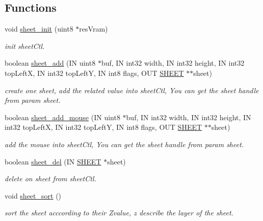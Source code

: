 \subsection*{Functions}
\begin{DoxyCompactItemize}
\item 
void \hyperlink{group__sheet_ga84bc4feeaed8d9ee63caa9ac081b4d90}{sheet\+\_\+init} (uint8 $\ast$res\+Vram)
\begin{DoxyCompactList}\small\item\em init sheet\+Ctl. \end{DoxyCompactList}\item 
boolean \hyperlink{group__sheet_ga91b935bbd00dee76f18e37307dbf116b}{sheet\+\_\+add} (I\+N uint8 $\ast$buf, I\+N int32 width, I\+N int32 height, I\+N int32 top\+Left\+X, I\+N int32 top\+Left\+Y, I\+N int8 flags, O\+U\+T \hyperlink{struct_s_h_e_e_t}{S\+H\+E\+E\+T} $\ast$$\ast$sheet)
\begin{DoxyCompactList}\small\item\em create one sheet, add the related value into sheet\+Ctl, You can get the sheet handle from param sheet. \end{DoxyCompactList}\item 
boolean \hyperlink{group__sheet_ga945f67fabfd3cdf76d1403692b6749eb}{sheet\+\_\+add\+\_\+mouse} (I\+N uint8 $\ast$buf, I\+N int32 width, I\+N int32 height, I\+N int32 top\+Left\+X, I\+N int32 top\+Left\+Y, I\+N int8 flags, O\+U\+T \hyperlink{struct_s_h_e_e_t}{S\+H\+E\+E\+T} $\ast$$\ast$sheet)
\begin{DoxyCompactList}\small\item\em add the mouse into sheet\+Ctl, You can get the sheet handle from param sheet. \end{DoxyCompactList}\item 
boolean \hyperlink{group__sheet_gac54d19422d9a8fc6ee0ac68b18d23664}{sheet\+\_\+del} (I\+N \hyperlink{struct_s_h_e_e_t}{S\+H\+E\+E\+T} $\ast$sheet)
\begin{DoxyCompactList}\small\item\em delete on sheet from sheet\+Ctl. \end{DoxyCompactList}\item 
void \hyperlink{group__sheet_gaac62e7c10483a2de006e8aaaaf32cab3}{sheet\+\_\+sort} ()
\begin{DoxyCompactList}\small\item\em sort the sheet acccording to their Zvalue, z describe the layer of the sheet. \end{DoxyCompactList}\item 

\end{DoxyCompactItemize}
